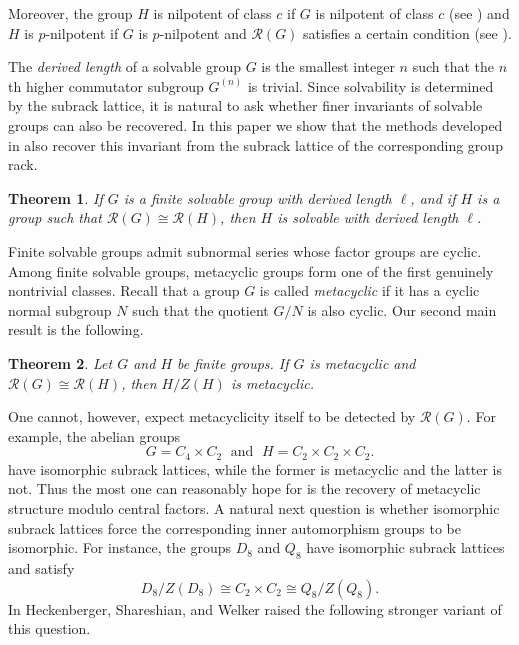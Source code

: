 \documentclass[a4paper,12pt]{article}
\newtheorem{thm}{Theorem}
\theoremstyle{definition}
\theoremstyle{remark}
\begin{document}
Moreover, the group $H$ is nilpotent of class $c$ if $G$ is nilpotent of class $c$ (see \cite[Theorem~3.3]{Kay21}) and $H$ is $p$-nilpotent if $G$ is $p$-nilpotent and $\mathcal{R}(G)$ satisfies a certain condition (see \cite[Theorem~4.5]{Kay21}).

The \emph{derived length} of a solvable group $G$ is the smallest integer $n$ such that the $n$th higher commutator subgroup $G^{(n)}$ is trivial. Since solvability is determined by the subrack lattice, it is natural to ask whether finer invariants of solvable groups can also be recovered. In this paper we show that the methods developed in \cite{Kay21} also recover this invariant from the subrack lattice of the corresponding group rack.

\begin{thm}\label{thm:main_derived}
  If $G$ is a finite solvable group with derived length $\ell$, and if $H$ is a group such that $\mathcal{R}(G)\cong \mathcal{R}(H)$, then $H$ is solvable with derived length $\ell$.
\end{thm}


Finite solvable groups admit subnormal series whose factor groups are cyclic. Among finite solvable groups, metacyclic groups form one of the first genuinely nontrivial classes. Recall that a group $G$ is called \emph{metacyclic} if it has a cyclic normal subgroup $N$ such that the quotient $G/N$ is also cyclic. Our second main result is the following.


\begin{thm}\label{thm:main_metacyclic}
  Let $G$ and $H$ be finite groups. If $G$ is metacyclic and $\mathcal{R}(G)\cong \mathcal{R}(H)$, then $H/Z(H)$ is metacyclic.
\end{thm}

One cannot, however, expect metacyclicity itself to be detected by $\mathcal{R}(G)$. For example, the abelian groups 
  $$ G = C_4\times C_2\; \text{ and }\; H = C_2\times C_2\times C_2.$$
  have isomorphic subrack lattices, while the former is metacyclic and the latter is not. Thus the most one can reasonably hope for is the recovery of metacyclic structure modulo central factors. A natural next question is whether isomorphic subrack lattices force the corresponding inner automorphism groups to be isomorphic. For instance, the groups $D_8$ and $Q_8$ have isomorphic subrack lattices and satisfy
  $$ D_8/Z(D_8)\cong C_2\times C_2\cong Q_8/Z(Q_8). $$
In \cite{HSW19} Heckenberger, Shareshian, and Welker raised the following stronger variant of this question.
\end{document}
